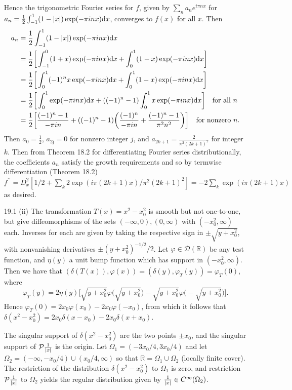 \documentclass[11pt]{article}
\begin{document}
\begin{enumerate}
    Hence the trigonometric Fourier series for $f$, given by $\sum_n a_ne^{i\pi nx}$ for $a_n = \frac{1}{2}\int_{-1}^1 (1-\abs{x})\exp(-\pi inx)\dd x$, converges to $f(x)$ for all $x$. Then \begin{align*}
        a_n &= \frac{1}{2}\int_{-1}^{1}(1-\abs{x})\exp(-\pi inx)\dd x \\
        &= \frac{1}{2}\bigg[\int_{-1}^0(1+x)\exp(-\pi inx)\dd x + \int_0^1(1-x)\exp(-\pi inx)\dd x\bigg]\\
        &= \frac{1}{2}\bigg[\int_0^1(-1)^nx\exp(-\pi inx)\dd x+ \int_0^1(1-x)\exp(-\pi inx)\dd x\bigg]\\
        &= \frac{1}{2}\bigg[\int_0^1\exp(-\pi inx)\dd x + ((-1)^n-1)\int_0^1x\exp(-\pi inx)\dd x\bigg]\quad \text{for all $n$}\\
        &= \frac{1}{2}\bigg[\frac{(-1)^n-1}{-\pi in}+ ((-1)^n-1)\bigg(\frac{(-1)^n}{-\pi in}+\frac{(-1)^n-1}{\pi^2n^2}\bigg)\bigg]\quad \text{for nonzero $n$}.
    \end{align*}
    Then $a_0 = \frac{1}{2}$, $a_{\text{2j}} = 0$ for nonzero integer $j$, and $a_{2k+1} = \frac{2}{\pi^2(2k+1)^2}$ for integer $k$. Then from Theorem 18.2 for differentiating Fourier series distributionally, the coefficients $a_n$ satisfy the growth requirements and so by termwise differentiation (Theorem 18.2) $f^{\prime\prime} = D_x^2 [1/2+\sum_{k}2\exp (i\pi(2k+1)x)/\pi^2(2k+1)^2] = -2\sum_k\exp(i\pi(2k+1)x)$ as desired.

    \hrulefill

    \item[19.1](ii) The transformation $T(x) = x^2-x_0^2$ is smooth but not one-to-one, but give diffeomorphisms of the sets $(-\infty,0),(0,\infty)$ with $(-x_0^2,\infty)$ each. Inverses for each are given by taking the respective sign in $\pm\sqrt{y+x_0^2}$, with nonvanishing derivatives $\pm (y+x_0^2)^{-1/2}/2$. Let $\varphi\in\mathcal{D}(\mathbb{R})$ be any test function, and $\eta(y)$ a unit bump function which has support in $(-x_0^2,\infty)$. Then we have that $(\delta(T(x)),\varphi(x)) = (\delta(y),\varphi_T(y)) = \varphi_T(0)$, where \[\varphi_T(y) = 2\eta(y)\bigg[\sqrt{y+x_0^2}\varphi\Big(\sqrt{y+x_0^2}\Big) -\sqrt{y+x_0^2} \varphi\Big(-\sqrt{y+x_0^2}\Big)\bigg].\] Hence $\varphi_T(0) = 2x_0\varphi(x_0) - 2x_0\varphi(-x_0)$, from which it follows that $\delta(x^2-x_0^2) = 2x_0\delta(x-x_0) - 2x_0\delta(x+x_0)$.
    
    The singular support of $\delta(x^2-x_0^2)$ are the two points $\pm x_0$, and the singular support of $\mathcal{P}\frac{1}{\abs{x}}$ is the origin. Let $\Omega_1 = (-3x_0/4,3x_0/4)$ and let $\Omega_2 = (-\infty,-x_0/4)\cup (x_0/4,\infty)$ so that $\mathbb{R} = \Omega_1\cup\Omega_2$ (locally finite cover). The restriction of the distribution $\delta(x^2-x_0^2)$ to $\Omega_1$ is zero, and restriction $\mathcal{P}\frac{1}{\abs{x}}$ to $\Omega_2$ yields the regular distribution given by $\frac{1}{\abs{x}}\in C^\infty(\Omega_2)$.


\end{enumerate}
\end{document}
